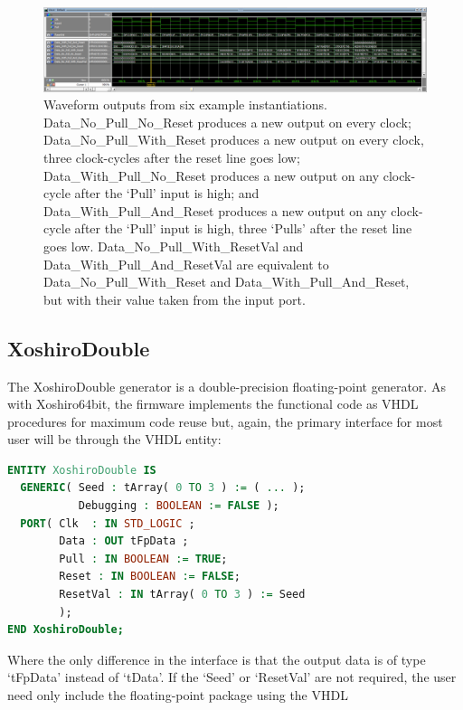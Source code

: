 \documentclass{article}
\begin{document}
\begin{figure}[ht]
\centering
\includegraphics[width=\textwidth]{ModelsimGui.png}
\caption{Waveform outputs from six example instantiations. Data\_No\_Pull\_No\_Reset produces a new output on every clock; Data\_No\_Pull\_With\_Reset produces a new output on every clock, three clock-cycles after the reset line goes low; Data\_With\_Pull\_No\_Reset produces a new output on any clock-cycle after the `Pull' input is high; and Data\_With\_Pull\_And\_Reset produces a new output on any clock-cycle after the `Pull' input is high, three `Pulls' after the reset line goes low. Data\_No\_Pull\_With\_ResetVal and Data\_With\_Pull\_And\_ResetVal are equivalent to Data\_No\_Pull\_With\_Reset and Data\_With\_Pull\_And\_Reset, but with their value taken from the input port.}
\label{fig:Modelsim_GUI_output}
\end{figure}

\subsection{XoshiroDouble}

The XoshiroDouble generator is a double-precision floating-point generator. As with Xoshiro64bit, the firmware implements the functional code as VHDL procedures for maximum code reuse but, again, the primary interface for most user will be through the VHDL entity:

\begin{minipage}{1.0\textwidth}
\centering
\begin{lstlisting}[language=VHDL, label=lst:XoshiroDouble_entity]
ENTITY XoshiroDouble IS
  GENERIC( Seed : tArray( 0 TO 3 ) := ( ... );
           Debugging : BOOLEAN := FALSE );
  PORT( Clk  : IN STD_LOGIC ;
        Data : OUT tFpData ;
        Pull : IN BOOLEAN := TRUE;
        Reset : IN BOOLEAN := FALSE;
        ResetVal : IN tArray( 0 TO 3 ) := Seed
        );
END XoshiroDouble;
\end{lstlisting}
\end{minipage}

Where the only difference in the interface is that the output data is of type `tFpData' instead of `tData'. If the `Seed' or `ResetVal' are not required, the user need only include the floating-point package using the VHDL
\end{document}
